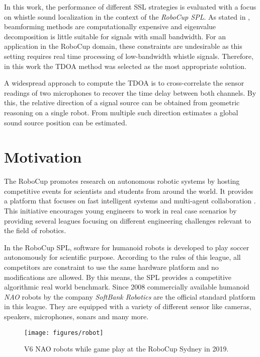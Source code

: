 In this work, the performance of different \ac{SSL} strategies is evaluated
with a focus on whistle sound localization in the context of the
\textit{\acs{RoboCup} \ac{SPL}}.
As stated in \cite{BAS_estimator}, beamforming methods are computationally
expensive and eigenvalue decomposition is little suitable for signals with
small bandwidth. For an application in the \acs{RoboCup} domain, these constraints
are undesirable as this setting requires real time processing of low-bandwidth
whistle signals.
Therefore, in this work the \ac{TDOA} method was selected as the
most appropriate solution.

A widespread approach to compute the \ac{TDOA} is to cross-correlate the sensor
readings of two microphones to recover the time delay between both channels\cite{brandstein_robust_method}.
By this, the relative direction of a signal source can be obtained from
geometric reasoning on a single robot. From multiple such direction estimates
a global sound source position can be estimated.

\section{Motivation}

The \acf{RoboCup} promotes research on autonomous robotic systems
by hosting competitive events for  scientists and students from around the
world.
It provides a platform that focuses on fast intelligent systems and multi-agent
collaboration \cite{robocup}. This initiative encourages young engineers to
work in real case scenarios by providing several leagues focusing on different
engineering challenges relevant to the field of robotics.

In the \ac{RoboCup} \acf{SPL}, software for humanoid robots is developed to
play soccer autonomously for scientific purpose.
According to the rules of this league, all competitors are constraint to use the
same hardware platform and no modifications are allowed. By this means, the \ac{SPL}
provides a competitive algorithmic real world benchmark.
Since 2008 commercially available humanoid \textit{NAO} robots by the company
\textit{SoftBank Robotics} are the official standard platform in this league.
They are equipped with a variety of different sensor like cameras, speakers,
microphones, sonars and many more.
\begin{figure}[ht]
	\centering
        \texttt{[image: figures/robot]}
	\caption[NAO robot]{V6 NAO robots while game play at the \ac{RoboCup} Sydney in 2019.}
	\label{fig:01_robot}
\end{figure}

